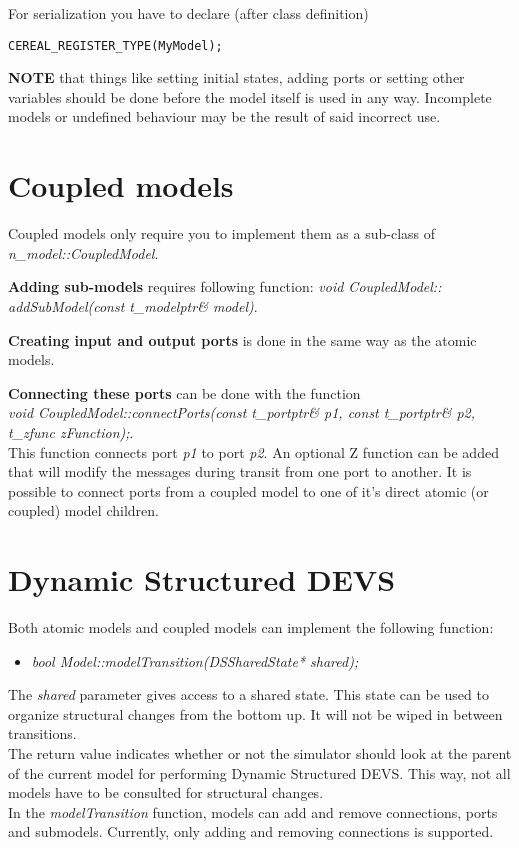 For serialization you have to declare (after class definition)
\begin{verbatim}
CEREAL_REGISTER_TYPE(MyModel);
\end{verbatim}

\textbf{NOTE} that things like setting initial states, adding ports or setting other variables should be done before the model itself is used in any way. Incomplete models or undefined behaviour may be the result of said incorrect use.

\section{Coupled models}
Coupled models only require you to implement them as a sub-class of \\ \textsl{n\_model::CoupledModel}.

\textbf{Adding sub-models} requires following function: \textsl{void CoupledModel:: \\addSubModel(const t\_modelptr\& model)}.

\textbf{Creating input and output ports} is done in the same way as the atomic models.

\textbf{Connecting these ports} can be done with the function\\ \textsl{void CoupledModel::connectPorts(const t\_portptr\& p1, const t\_portptr\& p2, t\_zfunc zFunction);}.\\ This function connects port \textsl{p1} to port \textsl{p2}. An optional Z function can be added that will modify the messages during transit from one port to another.
It is possible to connect ports from a coupled model to one of it's direct atomic (or coupled) model children.

\section{Dynamic Structured DEVS}
Both atomic models and coupled models can implement the following function:
\begin{itemize}
	\item \textsl{bool Model::modelTransition(DSSharedState* shared);}
\end{itemize}
The \textsl{shared} parameter gives access to a shared state. This state can be used to organize structural changes from the bottom up. It will not be wiped in between transitions.\\
The return value indicates whether or not the simulator should look at the parent of the current model for performing Dynamic Structured DEVS. This way, not all models have to be consulted for structural changes.\\
In the \textsl{modelTransition} function, models can add and remove connections, ports and submodels. Currently, only adding and removing connections is supported.